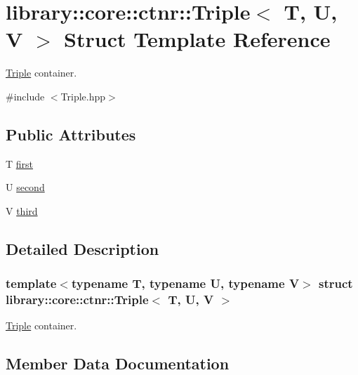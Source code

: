 \hypertarget{structlibrary_1_1core_1_1ctnr_1_1_triple}{}\section{library\+:\+:core\+:\+:ctnr\+:\+:Triple$<$ T, U, V $>$ Struct Template Reference}
\label{structlibrary_1_1core_1_1ctnr_1_1_triple}


\hyperlink{structlibrary_1_1core_1_1ctnr_1_1_triple}{Triple} container.  




{\ttfamily \#include $<$Triple.\+hpp$>$}

\subsection*{Public Attributes}
\begin{DoxyCompactItemize}
\item 
T \hyperlink{structlibrary_1_1core_1_1ctnr_1_1_triple_a620996265dbacc4b8961fcdd4694d1f4}{first}
\item 
U \hyperlink{structlibrary_1_1core_1_1ctnr_1_1_triple_a6727b9eb6453f0db0d0abfcd64dbc87e}{second}
\item 
V \hyperlink{structlibrary_1_1core_1_1ctnr_1_1_triple_a5fdac90c0f2e7a33f2fc5f3fc4dba8e2}{third}
\end{DoxyCompactItemize}


\subsection{Detailed Description}
\subsubsection*{template$<$typename T, typename U, typename V$>$\newline
struct library\+::core\+::ctnr\+::\+Triple$<$ T, U, V $>$}

\hyperlink{structlibrary_1_1core_1_1ctnr_1_1_triple}{Triple} container. 

\subsection{Member Data Documentation}
\mbox{\label{structlibrary_1_1core_1_1ctnr_1_1_triple_a620996265dbacc4b8961fcdd4694d1f4}} 
